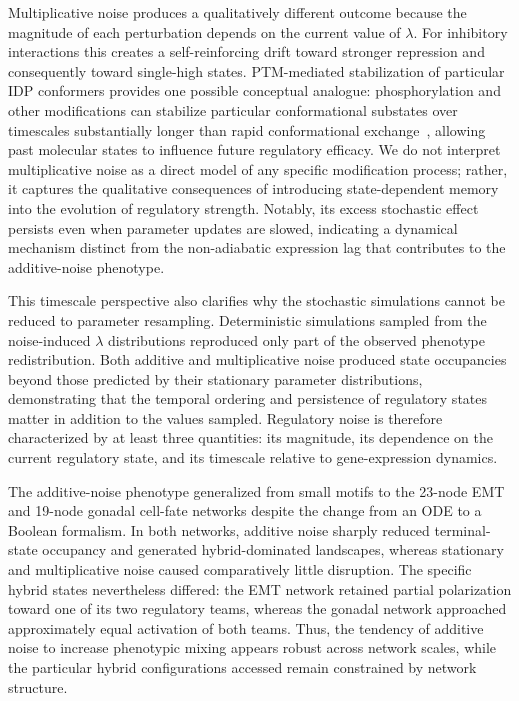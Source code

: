 \documentclass[11pt]{article}
\begin{document}
Multiplicative noise produces a qualitatively different outcome because the magnitude of each perturbation depends on the current value of $\lambda$. For inhibitory interactions this creates a self-reinforcing drift toward stronger repression and consequently toward single-high states. PTM-mediated stabilization of particular IDP conformers provides one possible conceptual analogue: phosphorylation and other modifications can stabilize particular conformational substates over timescales substantially longer than rapid conformational exchange~\cite{Kulkarni2022, Kulkarni2019}, allowing past molecular states to influence future regulatory efficacy. We do not interpret multiplicative noise as a direct model of any specific modification process; rather, it captures the qualitative consequences of introducing state-dependent memory into the evolution of regulatory strength. Notably, its excess stochastic effect persists even when parameter updates are slowed, indicating a dynamical mechanism distinct from the non-adiabatic expression lag that contributes to the additive-noise phenotype.

This timescale perspective also clarifies why the stochastic simulations cannot be reduced to parameter resampling. Deterministic simulations sampled from the noise-induced $\lambda$ distributions reproduced only part of the observed phenotype redistribution. Both additive and multiplicative noise produced state occupancies beyond those predicted by their stationary parameter distributions, demonstrating that the temporal ordering and persistence of regulatory states matter in addition to the values sampled. Regulatory noise is therefore characterized by at least three quantities: its magnitude, its dependence on the current regulatory state, and its timescale relative to gene-expression dynamics.

The additive-noise phenotype generalized from small motifs to the 23-node EMT and 19-node gonadal cell-fate networks despite the change from an ODE to a Boolean formalism. In both networks, additive noise sharply reduced terminal-state occupancy and generated hybrid-dominated landscapes, whereas stationary and multiplicative noise caused comparatively little disruption. The specific hybrid states nevertheless differed: the EMT network retained partial polarization toward one of its two regulatory teams, whereas the gonadal network approached approximately equal activation of both teams. Thus, the tendency of additive noise to increase phenotypic mixing appears robust across network scales, while the particular hybrid configurations accessed remain constrained by network structure.
\end{document}
